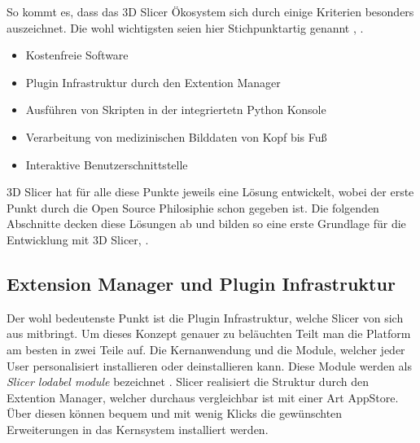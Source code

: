 So kommt es, dass das 3D Slicer Ökosystem sich durch einige Kriterien besonders auszeichnet.
Die wohl wichtigsten seien hier Stichpunktartig genannt \citep[vgl.][]{slicer2024},
\citep[vgl.][]{fedorov2012slicer}.

\begin{itemize}
	\item Kostenfreie Software

	\item Plugin Infrastruktur durch den Extention Manager

	\item Ausführen von Skripten in der integriertetn Python Konsole

	\item Verarbeitung von medizinischen Bilddaten von Kopf bis Fuß

	\item Interaktive Benutzerschnittstelle
\end{itemize}

3D Slicer hat für alle diese Punkte jeweils eine Lösung entwickelt, wobei der erste
Punkt durch die Open Source Philosiphie schon gegeben ist. Die folgenden
Abschnitte decken diese Lösungen ab und bilden so eine erste Grundlage für die
Entwicklung mit 3D Slicer\citep[vgl.][]{slicer2024}, \citep[vgl.][]{fedorov2012slicer}.

\subsection{Extension Manager und Plugin Infrastruktur}
Der wohl bedeutenste Punkt ist die Plugin Infrastruktur, welche Slicer von sich aus
mitbringt. Um dieses Konzept genauer zu beläuchten Teilt man die Platform am
besten in zwei Teile auf. Die Kernanwendung und die Module, welcher jeder User
personalisiert installieren oder deinstallieren kann. Diese Module werden als \textit{Slicer
lodabel module} bezeichnet \citep[vgl.][Seite 1332]{fedorov2012slicer}. Slicer realisiert
die Struktur durch den Extention Manager, welcher durchaus vergleichbar ist mit
einer Art AppStore. Über diesen können bequem und mit wenig Klicks die gewünschten
Erweiterungen in das Kernsystem installiert werden.

